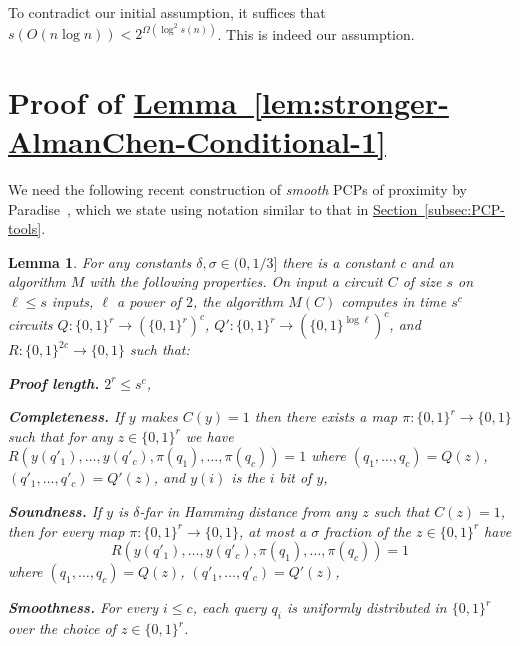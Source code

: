 \documentclass[11pt]{article}
\newcommand{\expref}[2]{\texorpdfstring{\hyperref[#2]{#1~\ref{#2}}}{#1~\ref{#2}}}
\newtheorem{lem}[theorem]{Lemma}  %
\newcommand{\zo}{\{0, 1\}}
\begin{document}
To contradict our initial assumption, it suffices that $s(O(n\log n))<2^{\Omega(\log^{2}s(n))}$.
This is indeed our assumption.

\section{Proof of \expref{Lemma}{lem:stronger-AlmanChen-Conditional-1} \label{sec:Proof-of-Lemma-stronger-AC}}

We need the following recent construction of \emph{smooth} PCPs of
proximity by Paradise~\cite{DBLP:journals/eccc/Paradise19}, which
we state using notation similar to that in \expref{Section}{subsec:PCP-tools}.
\begin{lem}
\label{lem:smooth-PCP}For any constants $\delta,\sigma\in(0,1/3]$
there is a constant $c$ and an algorithm $M$ with the following
properties. On input a circuit $C$ of size $s$ on $\ell\le s$ inputs,
$\ell$ a power of $2$, the algorithm $M(C)$ computes in time $s^{c}$
circuits $Q:\zo^{r}\to(\zo^{r})^{c}$, $Q':\zo^{r}\to(\zo^{\log\ell})^{c}$,
and $R:\zo^{2c}\to\zo$ such that:

\textbf{Proof length.} $2^{r}\le s^{c}$,

\textbf{Completeness.} If $y$ makes $C(y)=1$ then there exists a
map $\pi:\zo^{r}\to\zo$ such that for any $z\in\zo^{r}$ we have
$R(y(q'_{1}),\ldots,y(q'_{c}),\pi(q_{1}),\ldots,\pi(q_{c}))=1$ where
$(q_{1},\ldots,q_{c})=Q(z)$, $(q'_{1},\ldots,q'_{c})=Q'(z)$, and
$y(i)$ is the $i$ bit of $y$,

\textbf{Soundness.} If $y$ is $\delta$-far in Hamming distance from
any $z$ such that $C(z)=1$, then for every map $\pi:\zo^{r}\to\zo$,
at most a $\sigma$ fraction of the
$z\in\zo^{r}$ have  %
%
\[ R(y(q'_{1}),\ldots,y(q'_{c}),\pi(q_{1}),\ldots,\pi(q_{c}))=1 \]  %
where $(q_{1},\ldots,q_{c})=Q(z)$, $(q'_{1},\ldots,q'_{c})=Q'(z)$,

\textbf{Smoothness.} For every $i\le c$, each query $q_{i}$ is uniformly
distributed in $\zo^{r}$ over the choice of $z\in\zo^{r}$.
\end{lem}
\end{document}
